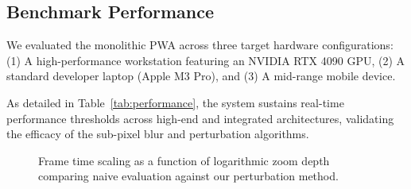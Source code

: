 \documentclass[10pt,journal,compsoc]{IEEEtran}
\begin{document}
\subsection{Benchmark Performance}
We evaluated the monolithic PWA across three target hardware configurations: (1) A high-performance workstation featuring an NVIDIA RTX 4090 GPU, (2) A standard developer laptop (Apple M3 Pro), and (3) A mid-range mobile device.

\begin{table}[htbp]
\caption{Empirical Frame-Rate Performance ($60\,\text{FPS}$ Target, $1920 \times 1080$ Resolution)}
\label{tab:performance}
\begin{center}
\end{center}
\end{table}

As detailed in Table~\ref{tab:performance}, the system sustains real-time performance thresholds across high-end and integrated architectures, validating the efficacy of the sub-pixel blur and perturbation algorithms.

\begin{figure}[htbp]
\centering
{}
\caption{Frame time scaling as a function of logarithmic zoom depth comparing naive evaluation against our perturbation method.}
\label{fig:frametime}
\end{figure}
\end{document}
